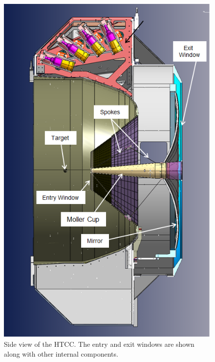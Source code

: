 \begin{figure}[ht]
    \centering
    \includegraphics[trim={1.5cm 5cm 0 2cm }, clip, width=\linewidth]{images/Spokes2.png}
    \caption{Side view of the HTCC. The  entry and exit windows are shown along with other internal components.}
    \label{fig:side_view}
\end{figure}

